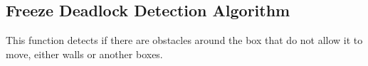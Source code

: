 \documentclass{article}
\begin{document}
\subsection{Freeze Deadlock Detection Algorithm}

This function detects if there are obstacles around the box that do not allow it to move, either walls or another boxes.


\end{document}
